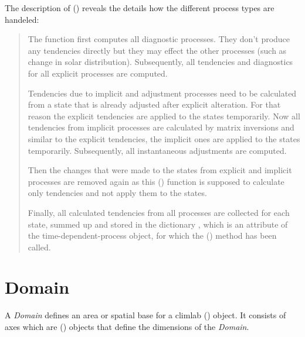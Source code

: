 \documentclass[a4paper,10pt,english]{sphinxmanual}
\begin{document}
The description of {\hyperref[api/climlab.process:climlab.process.time_dependent_process.TimeDependentProcess.compute]{\emph{}}} () reveals the details how the different process types are handeled:
\begin{quote}

The function first computes all diagnostic processes. They don't produce
any tendencies directly but they may effect the other processes (such as
change in solar distribution). Subsequently, all tendencies and diagnostics
for all explicit processes are computed.

Tendencies due to implicit and adjustment processes need to be
calculated from a state that is already adjusted after explicit
alteration. For that reason the explicit tendencies are applied to the states
temporarily. Now all tendencies from implicit processes are calculated
by matrix inversions and similar to the explicit tendencies, the implicit ones
are applied to the states temporarily. Subsequently, all instantaneous adjustments
are computed.

Then the changes that were made to the states from explicit and implicit
processes are removed again as this
{\hyperref[api/climlab.process:climlab.process.time_dependent_process.TimeDependentProcess.compute]{\emph{}}} ()
function is
supposed to calculate only tendencies and not apply them to the states.

Finally, all calculated tendencies from all processes are collected
for each state, summed up and stored in the dictionary
, which is an attribute of the time-dependent-process
object, for which the
{\hyperref[api/climlab.process:climlab.process.time_dependent_process.TimeDependentProcess.compute]{\emph{}}} ()
method has been called.
\end{quote}


\section{Domain}
\label{architecture:domain}
A \emph{Domain} defines an area or spatial base for a climlab {\hyperref[api/climlab.process:climlab.process.process.Process]{\emph{}}} () object. It consists of axes which
are {\hyperref[api/climlab.domain:climlab.domain.axis.Axis]{\emph{}}} () objects that define the dimensions of the \emph{Domain}.
\end{document}
